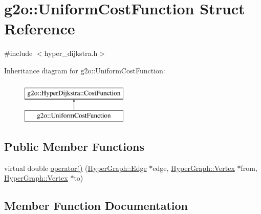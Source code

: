 \hypertarget{structg2o_1_1_uniform_cost_function}{}\section{g2o\+:\+:Uniform\+Cost\+Function Struct Reference}
\label{structg2o_1_1_uniform_cost_function}


{\ttfamily \#include $<$hyper\+\_\+dijkstra.\+h$>$}

Inheritance diagram for g2o\+:\+:Uniform\+Cost\+Function\+:\begin{figure}[H]
\begin{center}
\leavevmode
\includegraphics[height=2.000000cm]{structg2o_1_1_uniform_cost_function}
\end{center}
\end{figure}
\subsection*{Public Member Functions}
\begin{DoxyCompactItemize}
\item 
virtual double \mbox{\hyperlink{structg2o_1_1_uniform_cost_function_a44e15e4af4310890d4c7965cb6c7aaad}{operator()}} (\mbox{\hyperlink{classg2o_1_1_hyper_graph_1_1_edge}{Hyper\+Graph\+::\+Edge}} $\ast$edge, \mbox{\hyperlink{classg2o_1_1_hyper_graph_1_1_vertex}{Hyper\+Graph\+::\+Vertex}} $\ast$from, \mbox{\hyperlink{classg2o_1_1_hyper_graph_1_1_vertex}{Hyper\+Graph\+::\+Vertex}} $\ast$to)
\end{DoxyCompactItemize}


\subsection{Member Function Documentation}
\mbox{\label{structg2o_1_1_uniform_cost_function_a44e15e4af4310890d4c7965cb6c7aaad}} 
